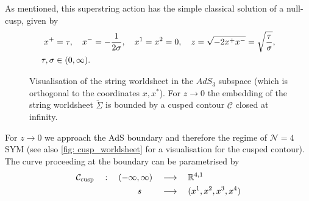 %
%
As mentioned, this  superstring action has the simple classical solution of a null-cusp, given by
%
%
\begin{align}
x^{+}&=\tau, \quad x^{-}=-\frac{1}{2\sigma}, \quad x^{1}=x^{2}=0, \quad z=\sqrt{-2x^{+}x^{-}}=\sqrt{\frac{\tau}{\sigma}},\label{eq: null_cusp} \\
\tau,\sigma &\in (0,\infty). \notag
\end{align}
%
%
\begin{figure}
\begin{center}
\caption{Visualisation of the string worldsheet in the $AdS_{3}$ subspace (which is orthogonal to the coordinates $x,x^{*}$). For $z\to 0$ the embedding of the string worldsheet $\widetilde{\Sigma}$ is bounded by a cusped contour $\mathcal{C}$ closed at infinity.\label{fig: cusp_worldsheet}}
\end{center}
\end{figure}
%
%
For $z\to 0$ we approach the AdS boundary and therefore the regime of $\mathcal{N}=4$ SYM (see also \autoref{fig: cusp_worldsheet} for a visualisation for the cusped contour). The curve proceeding at the boundary can be parametrised by
%
%
\begin{align}
\mathcal{C}_{\rm cusp}\quad :\quad (-\infty,\infty) \quad &\longrightarrow \quad \mathbb{R}^{4,1} \notag \\
%
s\qquad \; &\longrightarrow  \quad (x^{1},x^{2},x^{3},x^{4}) %
\end{align}
